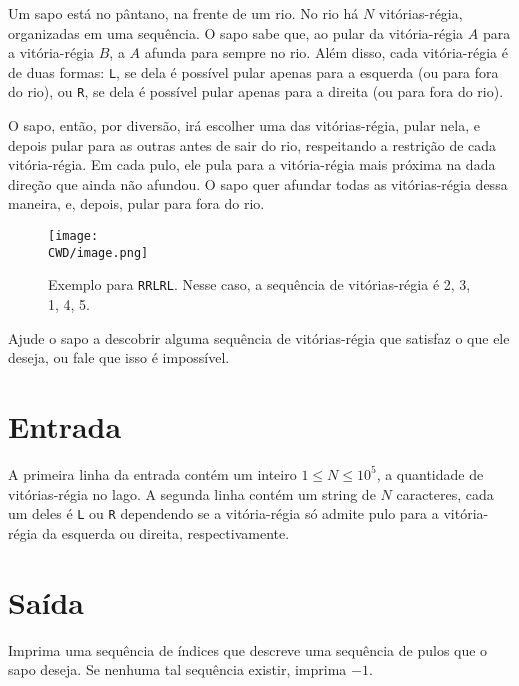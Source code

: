 %

Um sapo está no pântano, na frente de um rio. No rio há $N$ vitórias-régia, organizadas em uma sequência. O sapo sabe que, ao pular da vitória-régia $A$ para a vitória-régia $B$, a $A$ afunda para sempre no rio. Além disso, cada vitória-régia é de duas formas: {\tt L}, se dela é possível pular apenas para a esquerda (ou para fora do rio), ou {\tt R}, se dela é possível pular apenas para a direita (ou para fora do rio).

O sapo, então, por diversão, irá escolher uma das vitórias-régia, pular nela, e depois pular para as outras antes de sair do rio, respeitando a restrição de cada vitória-régia. Em cada pulo, ele pula para a vitória-régia mais próxima na dada direção que ainda não afundou. O sapo quer afundar todas as vitórias-régia dessa maneira, e, depois, pular para fora do rio.

\begin{figure}[H]
  \centering
  \texttt{[image: \\CWD/image.png]}
  \caption{Exemplo para {\tt RRLRL}. Nesse caso, a sequência de vitórias-régia é 2, 3, 1, 4, 5.}
\end{figure}

Ajude o sapo a descobrir alguma sequência de vitórias-régia que satisfaz o que ele deseja, ou fale que isso é impossível.

%
%

\section*{Entrada}

A primeira linha da entrada contém um inteiro $1 \leq N \leq 10^5$, a quantidade de vitórias-régia no lago. A segunda linha contém um string de $N$ caracteres, cada um deles é {\tt L} ou {\tt R} dependendo se a vitória-régia só admite pulo para a vitória-régia da esquerda ou direita, respectivamente.

%
%

\section*{Saída}

Imprima uma sequência de índices que descreve uma sequência de pulos que o sapo deseja. Se nenhuma tal sequência existir, imprima $-1$.


\exemplo
